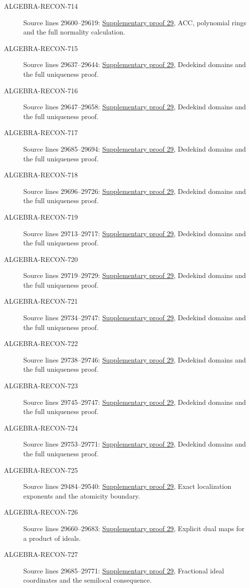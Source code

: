 \begin{description}
\item[ALGEBRA-RECON-714] Source lines 29600--29619: \hyperlink{algebra_factorization_notes_20260928}{Supplementary proof 29}, ACC, polynomial rings and the full normality calculation.
\item[ALGEBRA-RECON-715] Source lines 29637--29644: \hyperlink{algebra_factorization_notes_20260928}{Supplementary proof 29}, Dedekind domains and the full uniqueness proof.
\item[ALGEBRA-RECON-716] Source lines 29647--29658: \hyperlink{algebra_factorization_notes_20260928}{Supplementary proof 29}, Dedekind domains and the full uniqueness proof.
\item[ALGEBRA-RECON-717] Source lines 29685--29694: \hyperlink{algebra_factorization_notes_20260928}{Supplementary proof 29}, Dedekind domains and the full uniqueness proof.
\item[ALGEBRA-RECON-718] Source lines 29696--29726: \hyperlink{algebra_factorization_notes_20260928}{Supplementary proof 29}, Dedekind domains and the full uniqueness proof.
\item[ALGEBRA-RECON-719] Source lines 29713--29717: \hyperlink{algebra_factorization_notes_20260928}{Supplementary proof 29}, Dedekind domains and the full uniqueness proof.
\item[ALGEBRA-RECON-720] Source lines 29719--29729: \hyperlink{algebra_factorization_notes_20260928}{Supplementary proof 29}, Dedekind domains and the full uniqueness proof.
\item[ALGEBRA-RECON-721] Source lines 29734--29747: \hyperlink{algebra_factorization_notes_20260928}{Supplementary proof 29}, Dedekind domains and the full uniqueness proof.
\item[ALGEBRA-RECON-722] Source lines 29738--29746: \hyperlink{algebra_factorization_notes_20260928}{Supplementary proof 29}, Dedekind domains and the full uniqueness proof.
\item[ALGEBRA-RECON-723] Source lines 29745--29747: \hyperlink{algebra_factorization_notes_20260928}{Supplementary proof 29}, Dedekind domains and the full uniqueness proof.
\item[ALGEBRA-RECON-724] Source lines 29753--29771: \hyperlink{algebra_factorization_notes_20260928}{Supplementary proof 29}, Dedekind domains and the full uniqueness proof.
\item[ALGEBRA-RECON-725] Source lines 29484--29540: \hyperlink{algebra_factorization_notes_20260928}{Supplementary proof 29}, Exact localization exponents and the atomicity boundary.
\item[ALGEBRA-RECON-726] Source lines 29660--29683: \hyperlink{algebra_factorization_notes_20260928}{Supplementary proof 29}, Explicit dual maps for a product of ideals.
\item[ALGEBRA-RECON-727] Source lines 29685--29771: \hyperlink{algebra_factorization_notes_20260928}{Supplementary proof 29}, Fractional ideal coordinates and the semilocal consequence.
\end{description}


